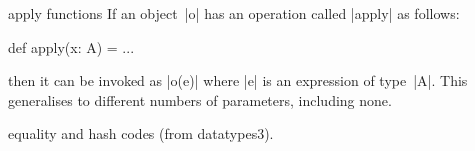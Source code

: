 \begin{scalaBox}{{\scalashape apply} functions}
\label{sb:apply}
If an object~|o| has an operation called |apply| as follows:
\begin{scala}
  def apply(x: A) = ...
\end{scala}
then it can be invoked as |o(e)| where  |e| is an expression of type~|A|.
This generalises to different numbers of parameters, including none.  
\end{scalaBox}

  equality and hash codes
(from datatypes3).
